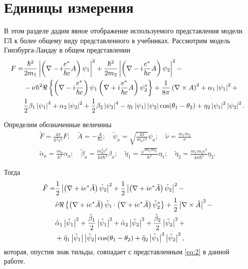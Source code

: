 \section{Единицы измерения}
\label{sec:units}

В этом разделе дадим явное отображение используемого представления модели ГЛ к 
более общему виду представленного в учебниках. Рассмотрим модель 
Гинзбурга-Ландау в общем представлении
\begin{align}
  F = & \frac{\hbar^2}{2m_1} \left| \left( \nabla - i\frac{e^*}{\hbar c} A\right)
    \psi_1 \right|^2 + \frac{\hbar^2}{2m_2} \left| \left( \nabla - i\frac{e^*}{\hbar c}A
    \right) \psi_2 \right|^2 - \nonumber \\
  & - \nu\hbar^2 \Re\left\{ \left( \nabla - i\frac{e^*}{\hbar c}
    \right)\psi_1 \left( \nabla + i\frac{e^*}{\hbar c}A \right)
    \psi^*_2\right\} + \frac{1}{8\pi}\left( \nabla\times A \right)^2 +
    \alpha_1\left| \psi_1 \right|^2 + \nonumber \\
  & \frac{1}{2}\beta_1\left| \psi_1 \right|^4 + \alpha_2\left| \psi_2 \right|^2 + \frac{1}{2}
    \beta_2\left| \psi_2 \right|^4 - \eta_1\left| \psi_1 \right|\left| \psi_2 \right|
    \cos(\theta_1 - \theta_2) + \eta_2\left| \psi_1 \right|^2\left| \psi_2 \right|^2.
    \label{eq:B-1}
\end{align}

Определим обозначенные величины
\begin{gather}
  \tilde{F} = \frac{4\pi}{\hbar^2 c^2}F; \quad
    \tilde{A} = -\frac{A}{\hbar c}; \quad
    \tilde{\psi}_a = \sqrt{\frac{4\pi}{m_a c^2}}\psi_a; \quad
    \tilde{\nu} = \frac{m_1m_2}\nu \nonumber \\
  \tilde{\alpha}_a = \frac{m_a}{\hbar^2}\alpha_a; \quad
    \tilde{\beta}_a = \frac{m^2_a c^2}{4\pi\hbar^2}\beta_a; \quad
    \tilde{\eta}_1 = \frac{\sqrt{m_1 m_2}}{\hbar^2}\eta_1; \quad
    \tilde{\eta}_2 = \frac{m_1 m_2 c^2}{4\pi\hbar^2}\eta_2. \label{eq:B-2}
\end{gather}

Тогда
\begin{align}
  \tilde{F} = & \frac{1}{2}\left| \left( \nabla + ie^*\tilde{A} \right)
    \tilde{\psi}_2 \right|^2 + \frac{1}{2}\left| \left( \nabla + ie^*\tilde{A} \right)
    \tilde{\psi}_2 \right|^2 - \nonumber \\ 
  & \tilde{\nu} \Re\left\{ \left( \nabla + ie^*\tilde{A}
    \right)\tilde{\psi}_1 \cdot \left( \nabla + ie^*\tilde{A} \right)
    \tilde{\psi}^*_2 \right\} + \frac{1}{2}\left| \nabla\times\tilde{A} \right|^2 - 
    \nonumber \\
  & \tilde{\alpha}_1
    \left| \tilde{\psi}_1 \right|^2 + \frac{\tilde{\beta}_1}{2}\left| \tilde{\psi}_1 \right|^2 +
    \tilde{\alpha}_2\left| \tilde{\psi}_2 \right|^2 +
    \frac{\tilde{\beta}_2}{2}\left| \tilde{\psi}_2 \right|^2 + \nonumber \\
  & + \tilde{\eta}_1 \left| \tilde{\psi}_1 \right| \left| \tilde{\psi}_2 \right|
    \cos(\theta_1 - \theta_2) + \tilde{\eta}_2\left| \tilde{\psi}_1 \right|^2
    \left| \tilde{\psi}_2 \right|^2, \label{eq:B-3}
\end{align}
которая, опустив знак тильды, совпадает с представленным \eqref{eq:2} в
данной работе.

